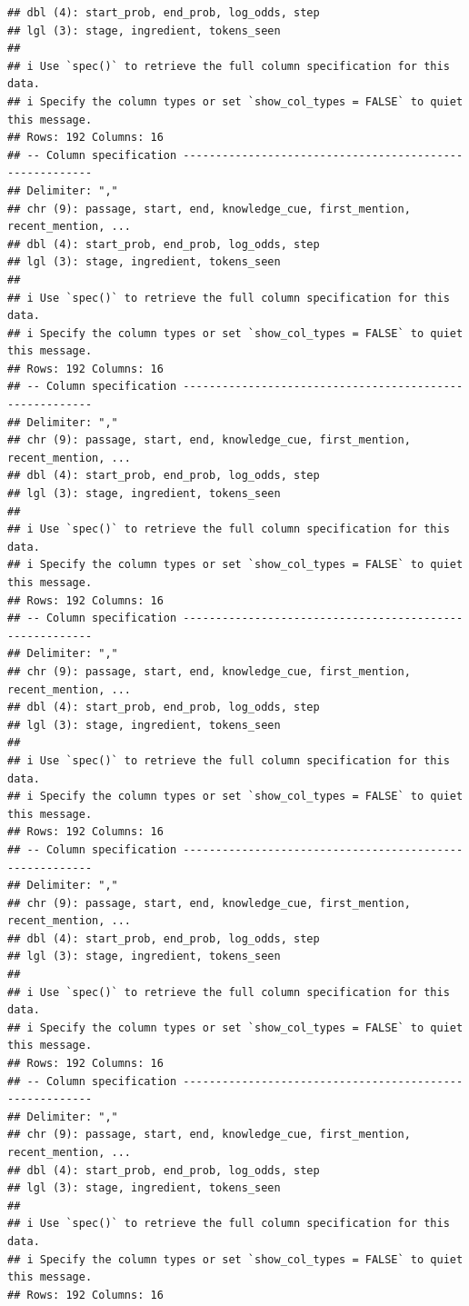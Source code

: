 \documentclass[
]{article}
\begin{document}
\begin{verbatim}
## dbl (4): start_prob, end_prob, log_odds, step
## lgl (3): stage, ingredient, tokens_seen
## 
## i Use `spec()` to retrieve the full column specification for this data.
## i Specify the column types or set `show_col_types = FALSE` to quiet this message.
## Rows: 192 Columns: 16
## -- Column specification --------------------------------------------------------
## Delimiter: ","
## chr (9): passage, start, end, knowledge_cue, first_mention, recent_mention, ...
## dbl (4): start_prob, end_prob, log_odds, step
## lgl (3): stage, ingredient, tokens_seen
## 
## i Use `spec()` to retrieve the full column specification for this data.
## i Specify the column types or set `show_col_types = FALSE` to quiet this message.
## Rows: 192 Columns: 16
## -- Column specification --------------------------------------------------------
## Delimiter: ","
## chr (9): passage, start, end, knowledge_cue, first_mention, recent_mention, ...
## dbl (4): start_prob, end_prob, log_odds, step
## lgl (3): stage, ingredient, tokens_seen
## 
## i Use `spec()` to retrieve the full column specification for this data.
## i Specify the column types or set `show_col_types = FALSE` to quiet this message.
## Rows: 192 Columns: 16
## -- Column specification --------------------------------------------------------
## Delimiter: ","
## chr (9): passage, start, end, knowledge_cue, first_mention, recent_mention, ...
## dbl (4): start_prob, end_prob, log_odds, step
## lgl (3): stage, ingredient, tokens_seen
## 
## i Use `spec()` to retrieve the full column specification for this data.
## i Specify the column types or set `show_col_types = FALSE` to quiet this message.
## Rows: 192 Columns: 16
## -- Column specification --------------------------------------------------------
## Delimiter: ","
## chr (9): passage, start, end, knowledge_cue, first_mention, recent_mention, ...
## dbl (4): start_prob, end_prob, log_odds, step
## lgl (3): stage, ingredient, tokens_seen
## 
## i Use `spec()` to retrieve the full column specification for this data.
## i Specify the column types or set `show_col_types = FALSE` to quiet this message.
## Rows: 192 Columns: 16
## -- Column specification --------------------------------------------------------
## Delimiter: ","
## chr (9): passage, start, end, knowledge_cue, first_mention, recent_mention, ...
## dbl (4): start_prob, end_prob, log_odds, step
## lgl (3): stage, ingredient, tokens_seen
## 
## i Use `spec()` to retrieve the full column specification for this data.
## i Specify the column types or set `show_col_types = FALSE` to quiet this message.
## Rows: 192 Columns: 16

\end{verbatim}
\end{document}
